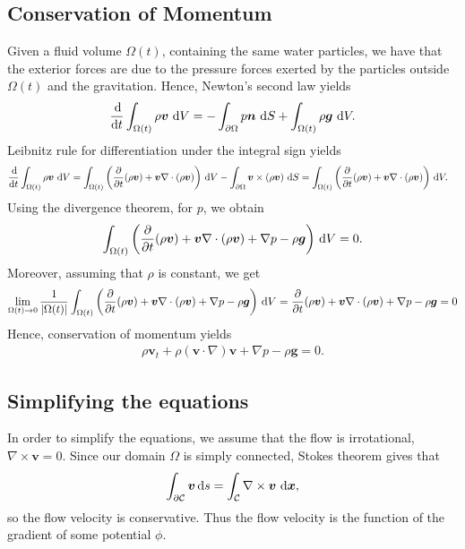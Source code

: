 \documentclass[11pt]{article}
\begin{document}
\subsection{Conservation of Momentum}
Given a fluid volume $\Omega(t)$, containing the same water particles, we have that the exterior forces are
due to the pressure forces exerted by the particles outside $\Omega(t)$ and the gravitation. Hence, Newton's second
law yields
\begin{align*}
    \frac{\operatorname{d}\! }{\operatorname{d}\! t}\int_{\Omega(t)}\rho \bm{v} \, \operatorname{d}\! V = -\int_{\partial \Omega} p \bm{n} \, \operatorname{d}\! S + \int_{\Omega(t)} \rho \bm{g} \, \operatorname{d}\! V.
\end{align*}
Leibnitz rule for differentiation under the integral sign yields
\begin{align*}
	\begin{aligned}
	    \frac{\operatorname{d}\!}{\operatorname{d}\! t} \int_{\Omega(t)} \rho \bm{v} \, \operatorname{d}\! V 
	        & = \int_{\Omega(t)} \bigg(\frac{\partial}{\partial t}(\rho \bm{v})
	                + \bm{v} \nabla \cdot (\rho \bm{v}) \bigg) \, \operatorname{d}\! V
	                - \int_{\partial \Omega} \bm{v} \times (\rho \bm{v}) \, \operatorname{d}\! S 
	         = \int_{\Omega(t)} \bigg(\frac{\partial}{\partial t}(\rho \bm{v})
	                + \bm{v} \nabla \cdot (\rho \bm{v}) \bigg) \, \operatorname{d}\! V.           
	\end{aligned}
\end{align*}
Using the divergence theorem, for $p$, we obtain
\begin{align*}
    \int_{\Omega(t)} \bigg(\frac{\partial}{\partial t}(\rho \bm{v})
	                + \bm{v} \nabla \cdot (\rho \bm{v}) + \nabla p - \rho \bm{g} \bigg) \, \operatorname{d}\! V = 0.
\end{align*}
Moreover, assuming that $\rho$ is constant, we get
\begin{align*}
    \lim_{\Omega(t) \rightarrow 0} \frac{1}{|\Omega(t)|}\int_{\Omega(t)} \bigg(\frac{\partial}{\partial t}(\rho \bm{v})
	                + \bm{v} \nabla \cdot (\rho \bm{v}) + \nabla p - \rho \bm{g} \bigg) \, \operatorname{d}\! V 
	                = \frac{\partial}{\partial t}(\rho \bm{v})
	                + \bm{v} \nabla \cdot (\rho \bm{v}) + \nabla p - \rho \bm{g} = 0
\end{align*}
Hence, conservation of momentum yields
\begin{align}
    \label{eq:momentumConservation}
    \rho \bm{v}_t + \rho(\bm{v} \cdot \nabla) \bm{v} + \nabla p - \rho \bm{g} = 0.
\end{align}
%
%
\subsection{Simplifying the equations}
In order to simplify the equations, we assume that the flow is irrotational, $\nabla \times \bm{v} = 0$. Since
our domain $\Omega$ is simply connected, Stokes theorem gives that
\begin{align*}
	\int_{\partial \mathcal{C}} \bm{v} \operatorname{d}\! s = \int_{\mathcal{C}} \nabla \times \bm{v} \, \operatorname{d}\! \bm{x},
\end{align*}
so the flow velocity is conservative. Thus the flow velocity is the function of the gradient
of some potential $\phi$.
\end{document}
